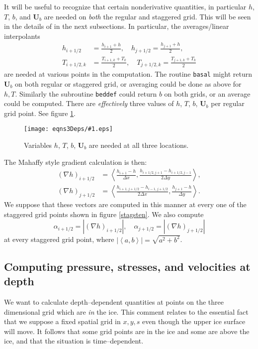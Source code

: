 \documentclass[12pt,final]{amsart}%
\theoremstyle{plain}
\theoremstyle{definition}
\theoremstyle{remark}
\newcommand{\regfigure}[2]{\texttt{[image: eqns3Deps/\#1.eps]}}
\newcommand{\mtt}{\texttt}
\newcommand{\grad}{\nabla}
\newcommand{\ip}[2]{\ensuremath{\left<#1,#2\right>}}
\newcommand{\bU}{{\mathbf{U}}}
\begin{document}
It will be useful to recognize that certain nonderivative quantities, in particular $h$, $T$, $b$, and $\bU_b$ are needed on \emph{both} the regular and staggered grid.  This will be seen in the details of in the next subsections.  In particular, the averages/linear interpolants
\begin{align}
h_{i+1/2}&=\frac{h_{i+1}+h}{2}, \quad h_{j+1/2}=\frac{h_{j+1}+h}{2}, \\
T_{i+1/2,k}&=\frac{T_{i+1,k}+T_k}{2}, \quad T_{j+1/2,k}=\frac{T_{j+1,k}+T_k}{2}\end{align}
are needed at various points in the computation.  The routine \mtt{basal} might return $\bU_b$ on both regular or staggered grid, or averaging could be done as above for $h,T$.  Similarly the subroutine \mtt{beddef} could return $b$ on both grids, or an average could be computed.  There are \emph{effectively} three values of $h$, $T$, $b$, $\bU_b$ per regular grid point.  See figure \ref{molecule}.

\begin{figure}[ht]
\regfigure{molecule}{1.75}
\vspace{-5mm}
\caption{Variables $h$, $T$, $b$, $\bU_b$ are needed at all three locations.}
\label{molecule}
\end{figure}

The Mahaffy style gradient calculation is then:
\begin{align}
(\grad h)_{i+1/2} &= \ip{\frac{h_{i+1}-h}{\Delta x}}{\frac{h_{i+1/2,j+1}-h_{i+1/2,j-1}}{2\Delta y}}, \\
(\grad h)_{j+1/2} &= \ip{\frac{h_{i+1,j+1/2}-h_{i-1,j+1/2}}{2\Delta x}}{\frac{h_{j+1}-h}{\Delta y}}.
\end{align}
We suppose that these vectors are computed in this manner at every one of the staggered grid points shown in figure \ref{stagsten}.  We also compute
\begin{equation}
  \alpha_{i+1/2} = |(\grad h)_{i+1/2}|, \quad \alpha_{j+1/2} = |(\grad h)_{j+1/2}|
\end{equation}
at every staggered grid point, where $|\ip{a}{b}|=\sqrt{a^2+b^2}$.


\subsection*{Computing pressure, stresses, and velocities at depth}\label{atdepthsubsect}  We want to calculate depth--dependent quantities at points on the three dimensional grid which are \emph{in} the ice.  This comment relates to the essential fact that we suppose a fixed spatial grid in $x,y,s$ even though the upper ice surface will move.  It follows that some grid points are in the ice and some are above the ice, and that the situation is time--dependent.
\end{document}

